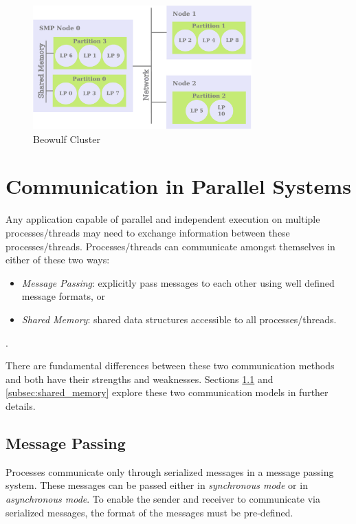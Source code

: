 \documentclass[11pt]{book}
\begin{document}
\begin{figure}
    \centering
    \includegraphics[width=0.75\textwidth]{figures/beowulf.pdf}
    \caption{Beowulf Cluster}\label{fig:beowulf}
\end{figure}

\section[\textsc{Communication}]{Communication in Parallel Systems}\label{sec:parallel_sys_comm}

Any application capable of parallel and independent execution on multiple processes/threads may
need to exchange information between these processes/threads.  Processes/threads can communicate
amongst themselves in either of these two ways:

\begin{itemize}

\item \emph{Message Passing}: explicitly pass messages to each other using well defined message formats, or

\item \emph{Shared Memory}: shared data structures accessible to all processes/threads.

\end{itemize}.

\noindent
There are fundamental differences between these two communication methods and both have their strengths and
weaknesses.  Sections \ref{subsec:msg_passing} and \ref{subsec:shared_memory} explore these two communication
models in further details.

\subsection{Message Passing}\label{subsec:msg_passing}

Processes communicate only through serialized messages in a message passing system.  These messages can be
passed either in \emph{synchronous mode} or in \emph{asynchronous mode}.  To enable the sender and receiver to
communicate via serialized messages, the format of the messages must be pre-defined.
\end{document}
